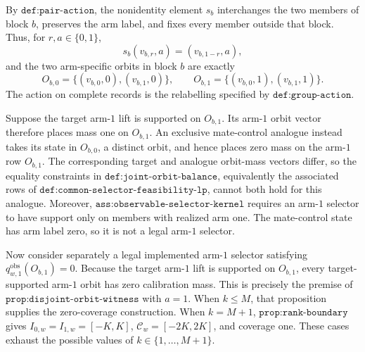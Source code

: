 By \(\texttt{def:pair-action}\), the nonidentity element \(s_b\) interchanges the two members of block \(b\), preserves the arm label, and fixes every member outside that block. Thus, for \(r,a\in\{0,1\}\),
\[s_b(v_{b,r},a)=(v_{b,1-r},a),\]
and the two arm-specific orbits in block \(b\) are exactly
\[O_{b,0}=\{(v_{b,0},0),(v_{b,1},0)\},\qquad O_{b,1}=\{(v_{b,0},1),(v_{b,1},1)\}.\]
The action on complete records is the relabelling specified by \(\texttt{def:group-action}\).

Suppose the target arm-\(1\) lift is supported on \(O_{b,1}\). Its arm-\(1\) orbit vector therefore places mass one on \(O_{b,1}\). An exclusive mate-control analogue instead takes its state in \(O_{b,0}\), a distinct orbit, and hence places zero mass on the arm-\(1\) row \(O_{b,1}\). The corresponding target and analogue orbit-mass vectors differ, so the equality constraints in \(\texttt{def:joint-orbit-balance}\), equivalently the associated rows of \(\texttt{def:common-selector-feasibility-lp}\), cannot both hold for this analogue. Moreover, \(\texttt{ass:observable-selector-kernel}\) requires an arm-\(1\) selector to have support only on members with realized arm one. The mate-control state has arm label zero, so it is not a legal arm-\(1\) selector.

Now consider separately a legal implemented arm-\(1\) selector satisfying \(q^{\mathrm{obs}}_{w,1}(O_{b,1})=0\). Because the target arm-\(1\) lift is supported on \(O_{b,1}\), every target-supported arm-\(1\) orbit has zero calibration mass. This is precisely the premise of \(\texttt{prop:disjoint-orbit-witness}\) with \(a=1\). When \(k\le M\), that proposition supplies the zero-coverage construction. When \(k=M+1\), \(\texttt{prop:rank-boundary}\) gives \(I_{0,w}=I_{1,w}=[-K,K]\), \(\mathcal C_w=[-2K,2K]\), and coverage one. These cases exhaust the possible values of \(k\in\{1,\ldots,M+1\}\).
